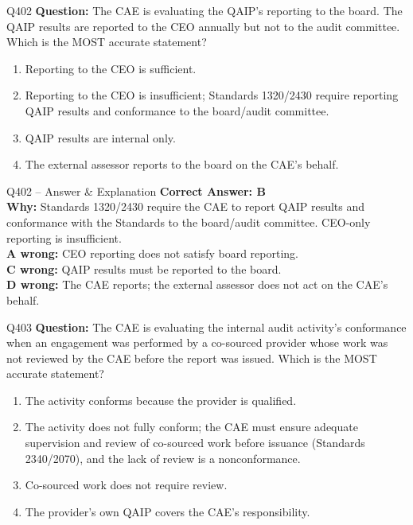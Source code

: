 \documentclass[aspectratio=169,10pt]{beamer}
\begin{document}
	\begin{frame}[t]{Q402}
		\small
		\textbf{Question:} The CAE is evaluating the QAIP's reporting to the board. The QAIP results are reported to the CEO annually but not to the audit committee. Which is the MOST accurate statement?
		\begin{enumerate}[label=\Alph*.,itemsep=1pt,topsep=2pt]
			\item Reporting to the CEO is sufficient.
			\item Reporting to the CEO is insufficient; Standards 1320/2430 require reporting QAIP results and conformance to the board/audit committee.
			\item QAIP results are internal only.
			\item The external assessor reports to the board on the CAE's behalf.
		\end{enumerate}
	\end{frame}
	
	\begin{frame}[t]{Q402 -- Answer \& Explanation}
		\small
		\textbf{Correct Answer: B} \\[4pt]
		\textbf{Why:} Standards 1320/2430 require the CAE to report QAIP results and conformance with the Standards to the board/audit committee. CEO-only reporting is insufficient. \\[4pt]
		\textbf{A wrong:} CEO reporting does not satisfy board reporting. \\[2pt]
		\textbf{C wrong:} QAIP results must be reported to the board. \\[2pt]
		\textbf{D wrong:} The CAE reports; the external assessor does not act on the CAE's behalf.
	\end{frame}
	
	\begin{frame}[t]{Q403}
		\small
		\textbf{Question:} The CAE is evaluating the internal audit activity's conformance when an engagement was performed by a co-sourced provider whose work was not reviewed by the CAE before the report was issued. Which is the MOST accurate statement?
		\begin{enumerate}[label=\Alph*.,itemsep=1pt,topsep=2pt]
			\item The activity conforms because the provider is qualified.
			\item The activity does not fully conform; the CAE must ensure adequate supervision and review of co-sourced work before issuance (Standards 2340/2070), and the lack of review is a nonconformance.
			\item Co-sourced work does not require review.
			\item The provider's own QAIP covers the CAE's responsibility.
		\end{enumerate}
	\end{frame}
	
\end{document}
